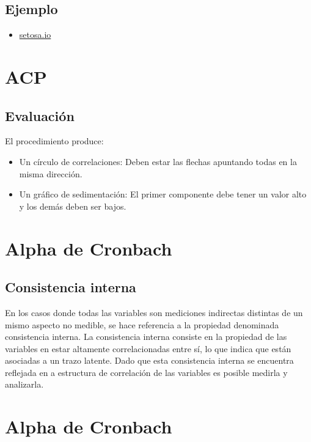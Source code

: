 \documentclass[
  letterpaper,
  DIV=11,
  numbers=noendperiod]{scrreprt}
\providecommand{\tightlist}{%
  \setlength{\itemsep}{0pt}\setlength{\parskip}{0pt}}\usepackage{longtable,booktabs,array}
\begin{document}
\subsection{Ejemplo}\label{ejemplo-4}

\begin{itemize}
\tightlist
\item
  \href{http://setosa.io/ev/principal-component-analysis/}{setosa.io}
\end{itemize}

\section{ACP}\label{acp-2}

\subsection{Evaluación}\label{evaluaciuxf3n}

El procedimiento produce:

\begin{itemize}
\item
  Un círculo de correlaciones: Deben estar las flechas apuntando todas
  en la misma dirección.
\item
  Un gráfico de sedimentación: El primer componente debe tener un valor
  alto y los demás deben ser bajos.
\end{itemize}

\section{Alpha de Cronbach}\label{alpha-de-cronbach}

\subsection{Consistencia interna}\label{consistencia-interna-1}

En los casos donde todas las variables son mediciones indirectas
distintas de un mismo aspecto no medible, se hace referencia a la
propiedad denominada consistencia interna. La consistencia interna
consiste en la propiedad de las variables en estar altamente
correlacionadas entre sí, lo que indica que están asociadas a un trazo
latente. Dado que esta consistencia interna se encuentra reflejada en a
estructura de correlación de las variables es posible medirla y
analizarla.

\section{Alpha de Cronbach}\label{alpha-de-cronbach-1}
\end{document}
